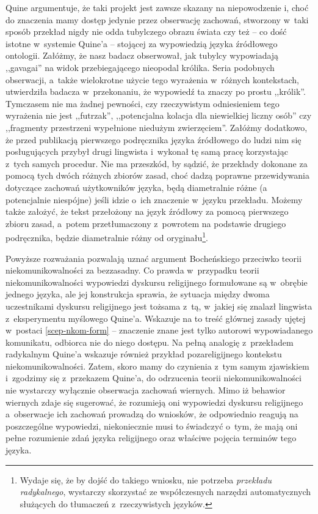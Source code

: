 Quine argumentuje, że taki projekt jest zawsze skazany na niepowodzenie i, choć do znaczenia mamy dostęp jedynie przez obserwację zachowań, stworzony w~taki sposób przekład nigdy nie odda tubylczego obrazu świata czy też -- co dość istotne w~systemie Quine'a -- stojącej za wypowiedzią języka źródłowego ontologii. Załóżmy, że nasz badacz obserwował, jak tubylcy wypowiadają ,,gavagai'' na widok przebiegającego nieopodal królika. Seria podobnych obserwacji, a~także wielokrotne użycie tego wyrażenia w~różnych kontekstach, utwierdziła badacza w~przekonaniu, że wypowiedź ta znaczy po prostu ,,królik''. Tymczasem nie ma żadnej pewności, czy rzeczywistym odniesieniem tego wyrażenia nie jest ,,futrzak'', ,,potencjalna kolacja dla niewielkiej liczny osób'' czy ,,fragmenty przestrzeni wypełnione niedużym zwierzęciem''. Załóżmy dodatkowo, że przed publikacją pierwszego podręcznika języka źródłowego do ludzi nim się posługujących przybył drugi lingwista i~wykonał tę samą pracę korzystając z~tych samych procedur. Nie ma przeszkód, by sądzić, że przekłady dokonane za pomocą tych dwóch różnych zbiorów zasad, choć dadzą poprawne przewidywania dotyczące zachowań użytkowników języka, będą diametralnie różne (a potencjalnie niespójne) jeśli idzie o~ich znaczenie w~języku przekładu. Możemy także założyć, że tekst przełożony na język źródłowy za pomocą pierwszego zbioru zasad, a~potem przetłumaczony z~powrotem na podstawie drugiego podręcznika, będzie diametralnie różny od oryginału\footnote{Wydaje się, że by dojść do takiego wniosku, nie potrzeba \textit{przekładu radykalnego}, wystarczy skorzystać ze współczesnych narzędzi automatycznych służących do tłumaczeń z~rzeczywistych języków.}.

Powyższe rozważania pozwalają uznać argument Bocheńskiego przeciwko teorii niekomunikowalności za bezzasadny. Co prawda w~przypadku teorii niekomunikowalności wypowiedzi dyskursu religijnego formułowane są w~obrębie jednego języka, ale jej konstrukcja sprawia, że sytuacja między dwoma uczestnikami dyskursu religijnego jest tożsama z~tą, w~jakiej się znalazł lingwista z~eksperymentu myślowego Quine'a. Wskazuje na to treść głównej zasady ujętej w~postaci \ref{scep-nkom-form} -- znaczenie znane jest tylko autorowi wypowiadanego komunikatu, odbiorca nie do niego dostępu. Na pełną analogię z~przekładem radykalnym Quine'a wskazuje również przykład pozareligijnego kontekstu niekomunikowalności. Zatem, skoro mamy do czynienia z~tym samym zjawiskiem i~zgodzimy się z~przekazem Quine'a, do odrzucenia teorii niekomunikowalności nie wystarczy wyłącznie obserwacja zachowań wiernych. Mimo iż behawior wiernych zdaje się sugerować, że rozumieją oni wypowiedzi dyskursu religijnego a~obserwacje ich zachowań prowadzą do wniosków, że odpowiednio reagują na poszczególne wypowiedzi, niekoniecznie musi to świadczyć o~tym, że mają oni pełne rozumienie zdań języka religijnego oraz właściwe pojęcia terminów tego języka.

